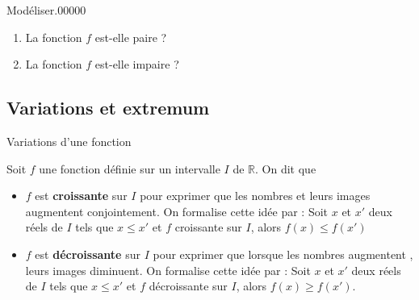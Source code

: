 \begin{pageAD}
\begin{minipage}{0.48 \linewidth}
\begin{ExoCadN}{Modéliser.}{0}{0}{0}{0}{0}
\begin{enumerate}[leftmargin=*]
\item La fonction $f$ est-elle paire ?


\item La fonction $f$ est-elle impaire ?

\end{enumerate}

\end{ExoCadN}
 \end{minipage}




\end{pageAD}
 

\begin{pageCours}

\section{Variations et extremum}

 
\begin{ThT}{Variations d'une fonction}

Soit $f$ une fonction définie sur un intervalle $I$ de $\mathbb R$. On dit que 
\begin{itemize}[leftmargin=*]
\item $f$ est \textbf{croissante} sur $I$ pour exprimer que les nombres et leurs images augmentent conjointement. On formalise cette idée par : Soit $x$ et $x'$ deux réels de $I$ tels que $x\leq x'$ et $f$ croissante sur $I$, alors $f(x) \leq f(x')$
\item $f$ est \textbf{décroissante} sur $I$ pour exprimer que lorsque les nombres augmentent , leurs images diminuent. On formalise cette idée par : Soit $x$ et $x'$ deux réels de $I$ tels que $x\leq x'$ et $f$ décroissante sur $I$, alors $f(x) \geq f(x')$.
\end{itemize} 
\end{ThT} 

  

%


\end{pageCours}
